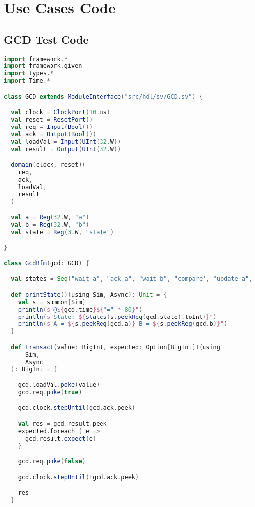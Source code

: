 \chapter{Use Cases Code} %
\section{GCD Test Code} %

\begin{lstlisting}[language=scala, captionpos=b, caption=Test code for the GCD circuit.,label=lst:gcd_test]
import framework.*
import framework.given
import types.*
import Time.*

class GCD extends ModuleInterface("src/hdl/sv/GCD.sv") {

  val clock = ClockPort(10.ns)
  val reset = ResetPort()
  val req = Input(Bool())
  val ack = Output(Bool())
  val loadVal = Input(UInt(32.W))
  val result = Output(UInt(32.W))

  domain(clock, reset)(
    req,
    ack,
    loadVal,
    result
  )

  val a = Reg(32.W, "a")
  val b = Reg(32.W, "b")
  val state = Reg(3.W, "state")

}

class GcdBfm(gcd: GCD) {

  val states = Seq("wait_a", "ack_a", "wait_b", "compare", "update_a", "update_b", "ack_result")

  def printState()(using Sim, Async): Unit = {
    val s = summon[Sim]
    println(s"@${gcd.time}${"=" * 80}")
    println(s"State: ${states(s.peekReg(gcd.state).toInt)}")
    println(s"A = ${s.peekReg(gcd.a)} B = ${s.peekReg(gcd.b)}")
  }

  def transact(value: BigInt, expected: Option[BigInt])(using
      Sim,
      Async
  ): BigInt = {

    gcd.loadVal.poke(value)
    gcd.req.poke(true)

    gcd.clock.stepUntil(gcd.ack.peek)

    val res = gcd.result.peek
    expected.foreach { e =>
      gcd.result.expect(e)
    }

    gcd.req.poke(false)

    gcd.clock.stepUntil(!gcd.ack.peek)

    res
  }


\end{lstlisting}
